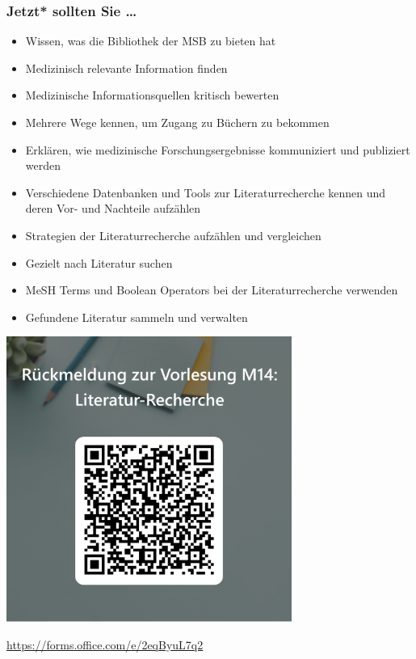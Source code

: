 \documentclass{beamer}
\begin{document}


\begin{frame}

\frametitle{Jetzt* sollten Sie \dots}


\begin{itemize}
\item
Wissen, was die Bibliothek der MSB zu bieten hat
\item 
Medizinisch relevante Information finden
\item 
Medizinische Informationsquellen kritisch bewerten
\item 
Mehrere Wege kennen, um Zugang zu Büchern zu bekommen
\item 
Erklären, wie medizinische Forschungsergebnisse kommuniziert und publiziert werden
\item 
Verschiedene Datenbanken und Tools zur Literaturrecherche kennen und deren Vor- und Nachteile aufzählen
\item 
Strategien der Literaturrecherche aufzählen und vergleichen
\item 
Gezielt nach Literatur suchen
\item 
MeSH Terms und Boolean Operators bei der Literaturrecherche verwenden
\item 
Gefundene Literatur sammeln und verwalten
\end{itemize}

\end{frame}


\begin{frame}

\begin{center}
    \includegraphics[width=0.7\textwidth]{feedback_QR.png}
\end{center}


\url{https://forms.office.com/e/2eqByuL7q2}

\end{frame}
\end{document}
